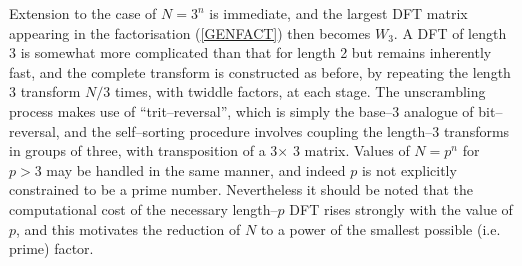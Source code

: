 \documentclass[dvips]{article}
\begin{document}
Extension to the case of $N=3^{n}$ is immediate, and the largest DFT matrix
appearing in the factorisation (\ref{GENFACT}) then becomes $W_{3}$.
A DFT of length 3 is somewhat more complicated than that for length 2
but remains inherently fast, and the complete transform is constructed
as before, by repeating the length 3 transform $N/3$ times, with twiddle
factors, at each stage.  The unscrambling process makes use of 
``trit--reversal'', which is simply the base--3 analogue of bit--reversal,
and the self--sorting procedure involves coupling the
length--3 transforms in groups of three, with transposition of a 3$\times$ 3
matrix.  Values of $N=p^{n}$ for $p>3$ may be handled in the same
manner, and indeed $p$ is not explicitly constrained to be a
prime number.  Nevertheless it should be noted that the computational cost of
the necessary length--$p$ DFT rises strongly with the value of $p$, and
this motivates the reduction of $N$ to a power of the smallest possible
(i.e. prime) factor.
 
\end{document}
